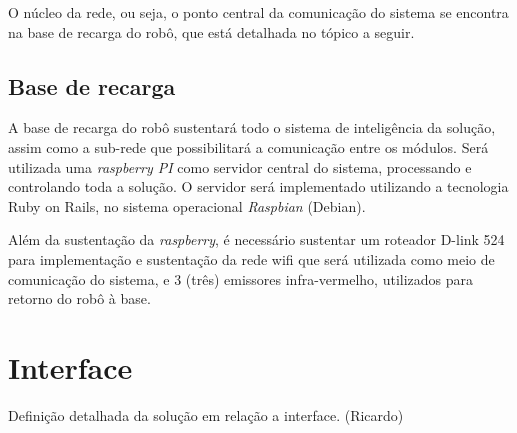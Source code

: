	O núcleo da rede, ou seja, o ponto central da comunicação do sistema se encontra na base de recarga do robô, que está detalhada no tópico a seguir.

	\subsection{Base de recarga}

	A base de recarga do robô sustentará todo o sistema de inteligência da solução, assim como a sub-rede que possibilitará a comunicação entre os módulos. Será utilizada uma \textit{raspberry PI} como servidor central do sistema, processando e controlando toda a solução. O servidor será implementado utilizando a tecnologia Ruby on Rails, no sistema operacional \textit{Raspbian} (Debian).

	Além da sustentação da \textit{raspberry}, é necessário sustentar um roteador D-link 524 para implementação e sustentação da rede wifi que será utilizada como meio de comunicação do sistema, e 3 (três) emissores infra-vermelho, utilizados para retorno do robô à base.
	

\section{Interface} %
\label{sub:interface}
	Definição detalhada da solução em relação a interface. (Ricardo)

